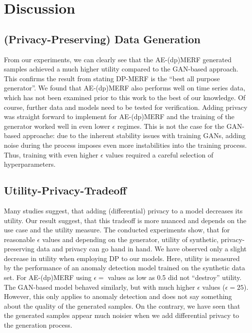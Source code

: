 \section{Discussion}

\subsection{(Privacy-Preserving) Data Generation}
From our experiments, we can clearly see that the AE-(dp)MERF generated samples achieved a much higher utility compared to the GAN-based approach. This confirms the result from \parencite{hu2023sok} stating DP-MERF is the ``best all purpose generator''. We found that AE-(dp)MERF also performs well on time series data, which has not been examined prior to this work to the best of our knowledge. Of course, further data and models need to be tested for verification. Adding privacy was straight forward to implement for AE-(dp)MERF and the training of the generator worked well in even lower $\epsilon$ regimes. This is not the case for the GAN-based approache: due to the inherent stability issues with training GANs, adding noise during the process imposes even more instabilities into the training process. Thus, training with even higher \(\epsilon\) values required a careful selection of hyperparameters.


\subsection{Utility-Privacy-Tradeoff}

Many studies suggest, that adding (differential) privacy to a model decreases its utility. Our result suggest, that this tradeoff is more nuanced and depends on the use case and the utility measure. The conducted experiments show, that for reasonable $\epsilon$ values and depending on the generator, utility of synthetic, privacy-preserving data and privacy can go hand in hand. We have observed only a slight decrease in utility when employing DP to our models. Here, utility is measured by the performance of an anomaly detection model trained on the synthetic data set. For AE-(dp)MERF using $\epsilon=$ values as low as 0.5 did not ``destroy'' utility. The GAN-based model behaved similarly, but with much higher \(\epsilon\) values ($\epsilon=25$). However, this only applies to anomaly detection and does not say something about the quality of the generated samples. On the contrary, we have seen that the generated samples appear much noisier when we add differential privacy to the generation process.


